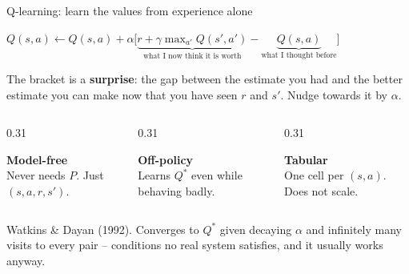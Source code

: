\documentclass[aspectratio=169]{beamer}
\begin{document}
\begin{frame}{Q-learning: learn the values from experience alone}
  \begin{center}
    {\large $Q(s,a) \leftarrow Q(s,a) + \alpha \Big[\underbrace{r + \gamma \max_{a'} Q(s',a')}_{\text{what I now think it is worth}} - \underbrace{Q(s,a)}_{\text{what I thought before}}\Big]$}
  \end{center}

  \vskip 10pt
  \small
  The bracket is a \textbf{surprise}: the gap between the estimate you had and the better
  estimate you can make now that you have seen $r$ and $s'$. Nudge towards it by $\alpha$.

  \vskip 8pt
  \begin{columns}[T]
    \begin{column}{0.31\textwidth}
      \begin{tcolorbox}[colback=paramgreen!8, colframe=paramgreen, boxrule=0.6pt, arc=2pt]
        \scriptsize\textbf{Model-free}\\ Never needs $P$. Just $(s,a,r,s')$.
      \end{tcolorbox}
    \end{column}
    \begin{column}{0.31\textwidth}
      \begin{tcolorbox}[colback=armorange!12, colframe=armorange, boxrule=0.6pt, arc=2pt]
        \scriptsize\textbf{Off-policy}\\ Learns $Q^*$ even while behaving badly.
      \end{tcolorbox}
    \end{column}
    \begin{column}{0.31\textwidth}
      \begin{tcolorbox}[colback=armred!8, colframe=armred, boxrule=0.6pt, arc=2pt]
        \scriptsize\textbf{Tabular}\\ One cell per $(s,a)$. Does not scale.
      \end{tcolorbox}
    \end{column}
  \end{columns}

  \vskip 8pt
  \scriptsize\color{gray}
  Watkins \& Dayan (1992). Converges to $Q^*$ given decaying $\alpha$ and infinitely many
  visits to every pair -- conditions no real system satisfies, and it usually works anyway.
\end{frame}
\end{document}
